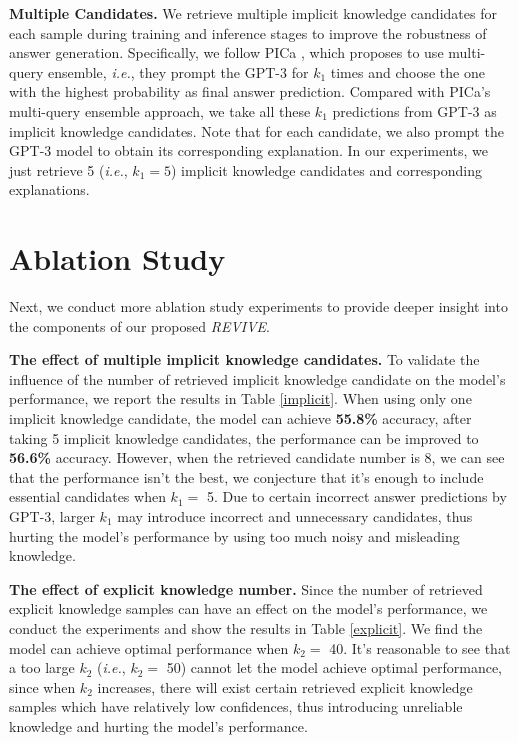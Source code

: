 \documentclass{article}
\begin{document}
\textbf{Multiple Candidates. } We retrieve multiple implicit knowledge candidates for each sample during training and inference stages to improve the robustness of answer generation. Specifically, we follow PICa \cite{yang2021empirical}, which proposes to use multi-query ensemble, \textit{i.e.}, they prompt the GPT-3 \cite{brown2020language} for $k_{1}$ times and choose the one with the highest probability as final answer prediction. Compared with PICa's multi-query ensemble approach, we take all these $k_{1}$ predictions from GPT-3 \cite{brown2020language} as implicit knowledge candidates. Note that for each candidate, we also prompt the GPT-3 model to obtain its corresponding explanation. In our experiments, we just retrieve 5 (\textit{i.e.}, $k_{1} = 5$) implicit knowledge candidates and corresponding explanations.

\section{Ablation Study}
\label{sup_ablation}

Next, we conduct more ablation study experiments to provide deeper insight into the components of our proposed \textit{REVIVE}.

\textbf{The effect of multiple implicit knowledge candidates. } To validate the influence of the number of retrieved implicit knowledge candidate on the model's performance, we report the results in Table \ref{implicit}. When using only one implicit knowledge candidate, the model can achieve \textbf{55.8\%} accuracy, after taking 5 implicit knowledge candidates, the performance can be improved to \textbf{56.6\%} accuracy. However, when the retrieved candidate number is 8, we can see that the performance isn't the best, we conjecture that it's enough to include essential candidates when $k_{1}= $ 5. Due to certain incorrect answer predictions by GPT-3, larger $k_{1}$ may introduce incorrect and unnecessary candidates, thus hurting the model's performance by using too much noisy and misleading knowledge.

\textbf{The effect of explicit knowledge number. } Since the number of retrieved explicit knowledge samples can have an effect on the model's performance, we conduct the experiments and show the results in Table \ref{explicit}. We find the model can achieve optimal performance when $k_{2} = $ 40. It's reasonable to see that a too large $k_{2}$ (\textit{i.e.}, $k_{2} = $ 50) cannot let the model achieve optimal performance, since when $k_{2}$ increases, there will exist certain retrieved explicit knowledge samples which have relatively low confidences, thus introducing unreliable knowledge and hurting the model's performance.
\end{document}
